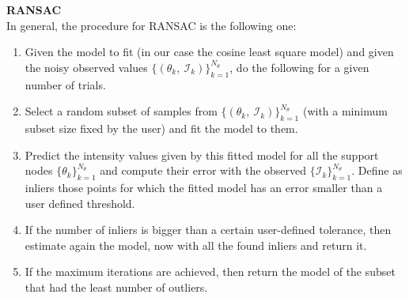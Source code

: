 \documentclass[11pt, a4paper, twoside]{article} %
\DeclareRobustCommand{\mybox}[2][gray!10]{%
\begin{tcolorbox}[   %
        left=0.2cm,
        right=0.2cm,
        top=0.15cm,
        bottom=0.15cm,
        colback=#1,
        colframe=#1,
        width=\dimexpr\textwidth\relax, 
        enlarge left by=0mm,
        boxsep=5pt,
        arc=0pt,outer arc=0pt,
        ]
        #2
\end{tcolorbox}
}
\begin{document}
\mybox{{\bf RANSAC\vspace{0.1cm}\\}
In general, the procedure for RANSAC \cite{RANSAC} is the following one:\vspace{-0.2cm}
\begin{enumerate}
\item Given the model to fit (in our case the cosine least square model) and given the noisy observed values $\{(\theta_k,\ \mathcal{I}_k)\}_{k=1}^{N_\theta}$, do the following for a given number of trials.\vspace{-0.1cm}

\item Select a random subset of samples from $\{(\theta_k,\ \mathcal{I}_k)\}_{k=1}^{N_\theta}$ (with a minimum subset size fixed by the user) and fit the model to them.\vspace{-0.1cm}
\item Predict the intensity values given by this fitted model for all the support nodes $\{\theta_k\}_{k=1}^{N_\theta}$ and compute their error with the observed $\{\mathcal{I}_k\}_{k=1}^{N_\theta}$. Define as inliers those points for which the fitted model has an error smaller than a user defined threshold.\vspace{-0.1cm}

\item If the number of inliers is bigger than a certain user-defined tolerance, then estimate again the model, now with all the found inliers and return it.\vspace{-0.1cm}

\item If the maximum iterations are achieved, then return the model of the subset that had the least number of outliers.
\end{enumerate}
}%
\end{document}
